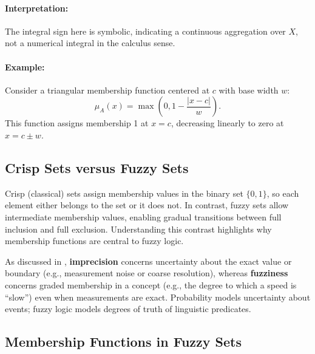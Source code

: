 \paragraph{Interpretation:} The integral sign here is symbolic, indicating a continuous aggregation over \( X \), not a numerical integral in the calculus sense.

\paragraph{Example:} Consider a triangular membership function centered at \( c \) with base width \( w \):
\begin{equation}
    \mu_A(x) = \max\left(0, 1 - \frac{|x - c|}{w}\right).
    \label{eq:triangular_mf}
\end{equation}
This function assigns membership 1 at \( x = c \), decreasing linearly to zero at \( x = c \pm w \).

\subsection{Crisp Sets versus Fuzzy Sets}
\label{sec:fuzzysets_crisp_sets_versus_fuzzy_sets}

Crisp (classical) sets assign membership values in the binary set \(\{0,1\}\), so each element either belongs to the set or it does not. In contrast, fuzzy sets allow intermediate membership values, enabling gradual transitions between full inclusion and full exclusion. Understanding this contrast highlights why membership functions are central to fuzzy logic.
\begin{tcolorbox}[title={Imprecision vs. Fuzziness (recap)}, colback=gray!5, colframe=gray!40, boxrule=0.4pt]
As discussed in , \textbf{imprecision} concerns uncertainty about the exact value or boundary (e.g., measurement noise or coarse resolution), whereas \textbf{fuzziness} concerns graded membership in a concept (e.g., the degree to which a speed is ``slow'') even when measurements are exact. Probability models uncertainty about events; fuzzy logic models degrees of truth of linguistic predicates.
\end{tcolorbox}

\subsection{Membership Functions in Fuzzy Sets}
\label{sec:fuzzysets_membership_functions_in_fuzzy_sets}

